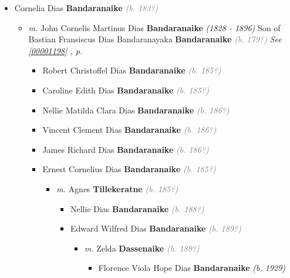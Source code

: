 \documentclass[10pt, openany]{book}
\begin{document}
\begin{itemize}
{\begin{itemize}
{\begin{itemize}
{\begin{itemize}
{\begin{itemize}
{\begin{itemize}
\item{Cornelia Dias \textbf{Bandaranaike} \textcolor{gray}{\textit{(b. 183?)}}
\begin{itemize}
\item{\textit{m.} John Cornelis Martinus Dias \textbf{Bandaranaike} \textcolor{slorange}{\textit{(1828 - 1896)}} Son of  Bastian Fransiscus Dias Bandaranayaka \textbf{Bandaranaike} \textcolor{gray}{\textit{(b. 179?)}} \textcolor{slteal}{\textit{See  \autoref{00001198} \textit{, p. \pageref{00001198} }}}   \label{couple:00001336:00001337} \begin{itemize}
\item{Robert Christoffel Dias \textbf{Bandaranaike} \textcolor{gray}{\textit{(b. 185?)}}
   }
\item{Caroline Edith Dias \textbf{Bandaranaike} \textcolor{gray}{\textit{(b. 185?)}}
   }
\item{Nellie Matilda Clara Dias \textbf{Bandaranaike} \textcolor{gray}{\textit{(b. 186?)}}
    }
\item{Vincent Clement Dias \textbf{Bandaranaike} \textcolor{gray}{\textit{(b. 186?)}}
   }
\item{James Richard Dias \textbf{Bandaranaike} \textcolor{gray}{\textit{(b. 186?)}}
   }
\item{Ernest Cornelius Dias \textbf{Bandaranaike} \textcolor{gray}{\textit{(b. 185?)}}
\begin{itemize}
\item{\textit{m.} Agnes \textbf{Tillekeratne} \textcolor{gray}{\textit{(b. 185?)}}   \label{couple:00002418:00002419} \begin{itemize}
\item{Nellie Dias \textbf{Bandaranaike} \textcolor{gray}{\textit{(b. 188?)}}
  }
\item{Edward Wilfred Dias \textbf{Bandaranaike} \textcolor{gray}{\textit{(b. 189?)}}
\begin{itemize}
\item{\textit{m.} Zelda \textbf{Dassenaike} \textcolor{gray}{\textit{(b. 189?)}}   \label{couple:00002426:00002427} \begin{itemize}
\item{Florence Viola Hope Dias \textbf{Bandaranaike} \textcolor{slorange}{\textit{(b. 1929)}}
}
\end{itemize}}
\end{itemize}}
\end{itemize}}
\end{itemize}}
\end{itemize}}
\end{itemize}}
\end{itemize}}
\end{itemize}}
\end{itemize}}
\end{itemize}}
\end{itemize}}
\end{itemize}
\end{document}

